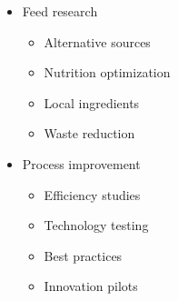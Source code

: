 \begin{itemize}
\begin{itemize}
        \item Feed research
        \begin{itemize}
            \item Alternative sources
            \item Nutrition optimization
            \item Local ingredients
            \item Waste reduction
        \end{itemize}
        
        \item Process improvement
        \begin{itemize}
            \item Efficiency studies
            \item Technology testing
            \item Best practices
            \item Innovation pilots
        \end{itemize}
    \end{itemize}
\end{itemize}

